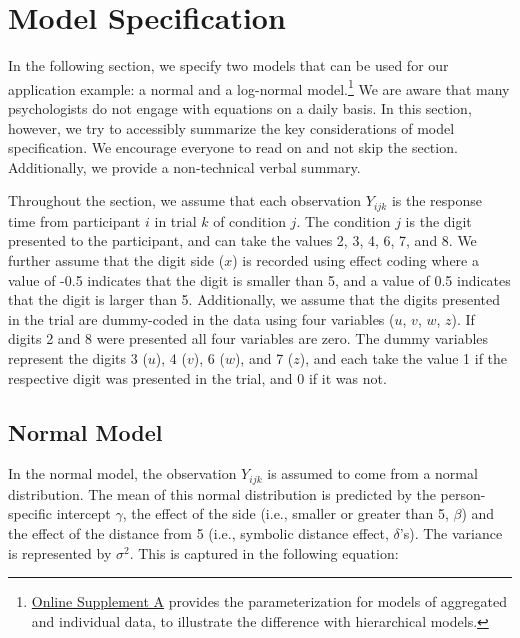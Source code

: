 \documentclass[
  english,
  doc,floatsintext]{apa6}
\begin{document}
\hypertarget{model-specification}{%
\section{Model Specification}\label{model-specification}}

In the following section, we specify two models that can be used for our application example: a normal and a log-normal model.\footnote{\href{https://github.com/MyrtheV/Bayesian-Hierarchical-Modelling-An-Introduction-and-Reassessment/blob/main/A\%20-\%20Model\%20Parameterization\%20/Online-Supplement-A---Model-Parameterization-for-Aggregated-and-Individual-Models.pdf}{Online Supplement A} provides the parameterization for models of aggregated and individual data, to illustrate the difference with hierarchical models.} We are aware that many psychologists do not engage with equations on a daily basis. In this section, however, we try to accessibly summarize the key considerations of model specification. We encourage everyone to read on and not skip the section. Additionally, we provide a non-technical verbal summary.

Throughout the section, we assume that each observation \(Y_{ijk}\) is the response time from participant \(i\) in trial \(k\) of condition \(j\). The condition \(j\) is the digit presented to the participant, and can take the values 2, 3, 4, 6, 7, and 8. We further assume that the digit side (\(x\)) is recorded using effect coding where a value of -0.5 indicates that the digit is smaller than 5, and a value of 0.5 indicates that the digit is larger than 5. Additionally, we assume that the digits presented in the trial are dummy-coded in the data using four variables (\(u\), \(v\), \(w\), \(z\)). If digits 2 and 8 were presented all four variables are zero. The dummy variables represent the digits 3 (\(u\)), 4 (\(v\)), 6 (\(w\)), and 7 (\(z\)), and each take the value 1 if the respective digit was presented in the trial, and 0 if it was not.

\hypertarget{normal-model}{%
\subsection{Normal Model}\label{normal-model}}

In the normal model, the observation \(Y_{ijk}\) is assumed to come from a normal distribution. The mean of this normal distribution is predicted by the person-specific intercept \(\gamma\), the effect of the side (i.e., smaller or greater than 5, \(\beta\)) and the effect of the distance from 5 (i.e., symbolic distance effect, \(\delta\)'s). The variance is represented by \(\sigma^2\). This is captured in the following equation:
\end{document}
